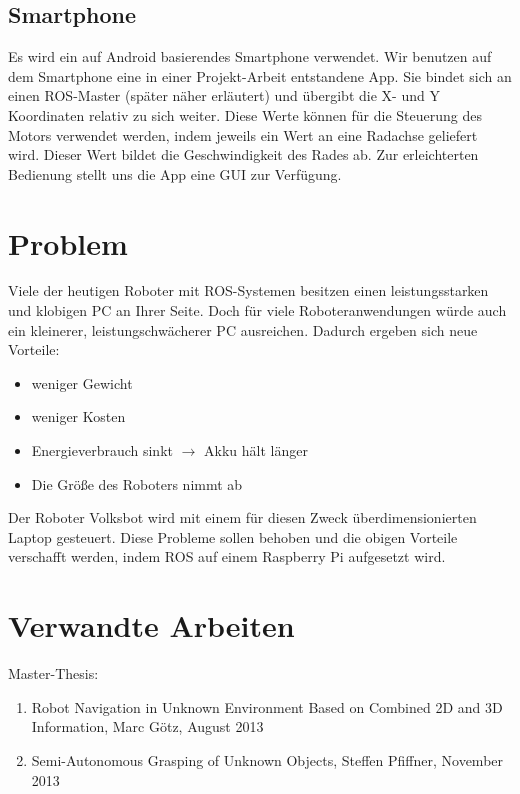 \documentclass[12pt]{article}
\begin{document}
\subsection{Smartphone}

Es wird ein auf Android basierendes Smartphone verwendet.
Wir benutzen auf dem Smartphone eine in einer Projekt-Arbeit entstandene App. \cite{TeleopApp}
Sie bindet sich an einen ROS-Master (später näher erläutert) und übergibt die X- und Y Koordinaten relativ zu sich weiter.
Diese Werte können für die Steuerung des Motors verwendet werden, indem jeweils ein Wert an eine Radachse geliefert wird. Dieser Wert bildet die Geschwindigkeit des Rades ab.
Zur erleichterten Bedienung stellt uns die App eine GUI zur Verfügung. 

\section{Problem}

Viele der heutigen Roboter mit ROS-Systemen besitzen einen leistungsstarken und klobigen PC an Ihrer Seite.
Doch für viele Roboteranwendungen würde auch ein kleinerer, leistungschwächerer PC ausreichen.
Dadurch ergeben sich neue Vorteile:

\begin{itemize}
\item weniger Gewicht
\item weniger Kosten
\item Energieverbrauch sinkt $\rightarrow$ Akku hält länger
\item Die Größe des Roboters nimmt ab
\end{itemize}

Der Roboter Volksbot wird mit einem für diesen Zweck überdimensionierten Laptop gesteuert. Diese Probleme sollen behoben und die obigen Vorteile verschafft werden, indem ROS auf einem Raspberry Pi aufgesetzt wird.

\section{Verwandte Arbeiten}

Master-Thesis:
\begin{enumerate}

\item Robot Navigation in Unknown Environment Based on Combined 2D and 3D Information, Marc Götz, August 2013
\item Semi-Autonomous Grasping of Unknown Objects, Steffen Pfiffner, November 2013
\end{enumerate}
\end{document}
